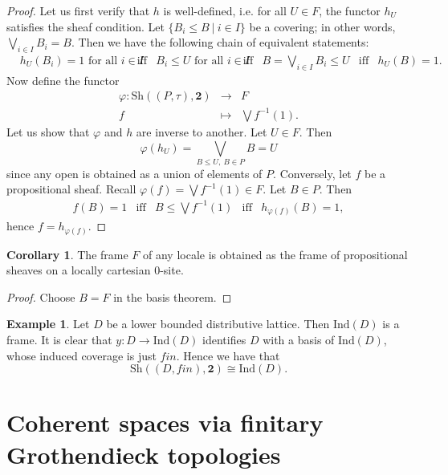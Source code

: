 \documentclass[10pt]{amsart}
\theoremstyle{definition}
\newtheorem{corollary}[theorem]{Corollary}
\newtheorem{example}[theorem]{Example}
\begin{document}
\begin{proof}
Let us first verify that $h$ is well-defined, i.e. for all $U \in F$, the functor $h_U$ satisfies the sheaf condition. Let $\{B_i \leq B ~|~ i \in I \}$ be a covering; in other words, $\bigvee_{i \in I} B_i = B$. Then we have the following chain of equivalent statements:
\[\begin{array}{rccccccl}
 & h_U(B_i) = 1 \text{ for all } i \in I &
\text{iff} & B_i \leq U \text{ for all } i \in I &
\text{iff} & B = \bigvee_{i \in I} B_i \leq U &
\text{iff} & h_U(B) = 1.
\end{array}\]
Now define the functor
$$\begin{array}{rcl}
\varphi: \mathrm{Sh}((P,\tau), \mathbf{2}) &\rightarrow & F \\
f & \mapsto &\bigvee f^{-1}(1).
\end{array}$$
Let us show that $\varphi$ and $h$ are inverse to another. Let $U \in F$. Then 
$$\varphi(h_U) = \bigvee_{B \leq U, ~ B \in P} B = U$$
since any open is obtained as a union of elements of $P$. Conversely, let $f$ be a propositional sheaf. Recall $\varphi(f) = \bigvee f^{-1}(1) \in F$. 
Let $B \in P$. Then 
\[\begin{array}{rcccl}
f(B) = 1 &
\text{iff} & B \leq \bigvee f^{-1}(1) &
\text{iff} & h_{\varphi(f)}(B) = 1,
\end{array}\]
hence $f = h_{\varphi(f)}$.
\end{proof}

\begin{corollary}
The frame $F$ of any locale is obtained as the frame of propositional sheaves on a locally cartesian $0$-site.
\end{corollary}

\begin{proof} Choose $B = F$ in the basis theorem.
\end{proof}

\begin{example} \label{indfinitetoplogy} Let $D$ be a lower bounded distributive lattice. Then $\mathrm{Ind}(D)$ is a frame. It is clear that $y : D \rightarrow \mathrm{Ind}(D)$ identifies $D$ with a basis of $\mathrm{Ind}(D)$, whose induced coverage is just $fin$. Hence we have that
$$\mathrm{Sh}((D,fin), \mathbf{2}) \cong \mathrm{Ind}(D).$$
\end{example}


\section{Coherent spaces via finitary Grothendieck topologies}
\end{document}
